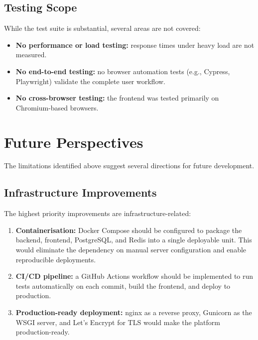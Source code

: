 \subsection{Testing Scope}

\noindent
While the test suite is substantial,
several areas are not covered:

\begin{itemize}
  \item \textbf{No performance or load testing:}
        response times under heavy load
        are not measured.
  \item \textbf{No end-to-end testing:}
        no browser automation tests
        (e.g., Cypress, Playwright)
        validate the complete user workflow.
  \item \textbf{No cross-browser testing:}
        the frontend was tested
        primarily on Chromium-based browsers.
\end{itemize}


\section{Future Perspectives}

\noindent
The limitations identified above
suggest several directions
for future development.

\subsection{Infrastructure Improvements}

\noindent
The highest priority improvements
are infrastructure-related:

\begin{enumerate}
  \item \textbf{Containerisation:}
        Docker Compose should be configured
        to package the backend, frontend,
        PostgreSQL, and Redis
        into a single deployable unit.
        This would eliminate the dependency
        on manual server configuration
        and enable reproducible deployments.
  \item \textbf{CI/CD pipeline:}
        a GitHub Actions workflow
        should be implemented
        to run tests automatically
        on each commit,
        build the frontend,
        and deploy to production.
  \item \textbf{Production-ready deployment:}
        nginx as a reverse proxy,
        Gunicorn as the WSGI server,
        and Let's Encrypt for TLS
        would make the platform
        production-ready.
\end{enumerate}


